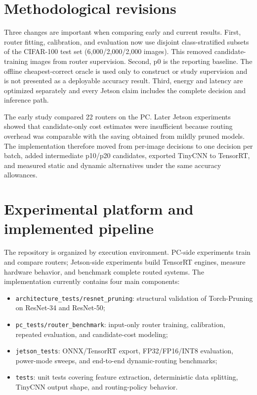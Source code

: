 \documentclass[11pt,a4paper]{article}
\newcommand{\code}[1]{\texttt{#1}}
\begin{document}
\section{Methodological revisions}

Three changes are important when comparing early and current results. First, router fitting, calibration, and evaluation now use disjoint class-stratified subsets of the CIFAR-100 test set (6,000/2,000/2,000 images). This removed candidate-training images from router supervision. Second, p0 is the reporting baseline. The offline cheapest-correct oracle is used only to construct or study supervision and is not presented as a deployable accuracy result. Third, energy and latency are optimized separately and every Jetson claim includes the complete decision and inference path.

The early study compared 22 routers on the PC. Later Jetson experiments showed that candidate-only cost estimates were insufficient because routing overhead was comparable with the saving obtained from mildly pruned models. The implementation therefore moved from per-image decisions to one decision per batch, added intermediate p10/p20 candidates, exported TinyCNN to TensorRT, and measured static and dynamic alternatives under the same accuracy allowances.

\section{Experimental platform and implemented pipeline}

The repository is organized by execution environment. PC-side experiments train and compare routers; Jetson-side experiments build TensorRT engines, measure hardware behavior, and benchmark complete routed systems. The implementation currently contains four main components:

\begin{itemize}
    \item \code{architecture\_tests/resnet\_pruning}: structural validation of Torch-Pruning on ResNet-34 and ResNet-50;
    \item \code{pc\_tests/router\_benchmark}: input-only router training, calibration, repeated evaluation, and candidate-cost modeling;
    \item \code{jetson\_tests}: ONNX/TensorRT export, FP32/FP16/INT8 evaluation, power-mode sweeps, and end-to-end dynamic-routing benchmarks;
    \item \code{tests}: unit tests covering feature extraction, deterministic data splitting, TinyCNN output shape, and routing-policy behavior.
\end{itemize}
\end{document}
